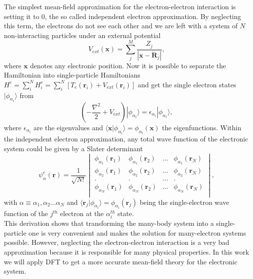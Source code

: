 The simplest mean-field approximation for the electron-electron interaction is setting it to $0$, the so called independent electron approximation. By neglecting this term, the electrons do not see each other and we are 
left with a system of $N$ non-interacting particles under an external potential
\begin{equation}
 V_{ext}(\mathbf{x})=\sum_{j}^{M}\frac{Z_{j}}{|\mathbf{x}-\mathbf{R}_{j}|},
\end{equation}
where $\mathbf{x}$ denotes any electronic position. Now it is possible to separate the Hamiltonian into single-particle Hamiltonians $H^{e}=\sum_{i}^{N}H_{i}^{e}=\sum_{i}^{N}[T_{e}(\mathbf{r}_{i})+V_{ext}(\mathbf{r}_{i})]$ and get 
the single electron states $|\phi_{\alpha_{i}}\rangle$ from
\begin{equation}
\label{independent-electron}
 \left(-\frac{\nabla^{2}}{2}+V_{ext}\right)|\phi_{\alpha_{i}}\rangle=\epsilon_{\alpha_{i}}|\phi_{\alpha_{i}}\rangle,
\end{equation}
where $\epsilon_{\alpha_{i}}$ are the eigenvalues and $\langle\mathbf{x}|\phi_{\alpha_{i}}\rangle=\phi_{\alpha_{i}}(\mathbf{x})$ the eigenfunctions. Within the independent electron approximation, any total wave function of the 
electronic system could be given by a Slater determinant\cite{slater1930note}
\begin{equation}
\label{slater}
 \psi_{\alpha}^{e}(\mathbf{r})=\frac{1}{\sqrt{N!}}
 \begin{vmatrix}
  \phi_{\alpha_{1}}(\mathbf{r}_{1}) & \phi_{\alpha_{1}}(\mathbf{r}_{2}) & \dots & \phi_{\alpha_{1}}(\mathbf{r}_{N}) \\
  \phi_{\alpha_{2}}(\mathbf{r}_{1}) & \phi_{\alpha_{2}}(\mathbf{r}_{2}) & \dots & \phi_{\alpha_{2}}(\mathbf{r}_{N}) \\
  . & . & \dots & . \\
  \phi_{\alpha_{N}}(\mathbf{r}_{1}) & \phi_{\alpha_{N}}(\mathbf{r}_{2}) & \dots & \phi_{\alpha_{N}}(\mathbf{r}_{N}) \\
 \end{vmatrix}
 ,
\end{equation}
with $\alpha\equiv\alpha_{1},\alpha_{2}\dots\alpha_{N}$ and $\langle\mathbf{r}_{j}|\phi_{\alpha_{i}}\rangle=\phi_{\alpha_{i}}(\mathbf{r}_{j})$ being the single-electron wave function of the $j^{th}$ electron at the 
$\alpha_{i}^{th}$ state. \\

This derivation shows that transforming the many-body system into a single-particle one is very convenient and makes the solution for many-electron systems possible. However, neglecting the electron-electron interaction 
is a very bad approximation\cite{ashcroft1976solid} because it is responsible for many physical properties. In this work we will apply DFT to get a more accurate mean-field theory for the electronic system.


